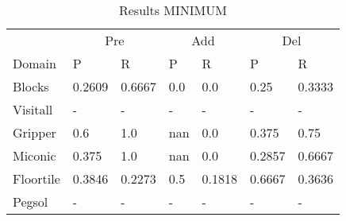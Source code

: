 \documentclass[]{article}
\begin{document}
\begin{table}
	\caption{Results MINIMUM}
	\label{tab:results_minimum}
	\begin{center}
		\begin{tabular}{l|l|l|l|l|l|l|}
			& \multicolumn{2}{|c|}{Pre} & \multicolumn{2}{|c|}{Add} & \multicolumn{2}{|c|}{Del}  \\ \cline{2-7}			 
			Domain & P & R & P & R & P & R \\
			\hline
			Blocks & 0.2609 & 0.6667 & 0.0 & 0.0 & 0.25 & 0.3333 \\
			Visitall & - & - & - & - & - & - \\
			Gripper & 0.6 & 1.0 & nan & 0.0 & 0.375 & 0.75 \\
			Miconic & 0.375 & 1.0 & nan & 0.0 & 0.2857 & 0.6667 \\
			Floortile & 0.3846 & 0.2273 & 0.5 & 0.1818 & 0.6667 & 0.3636 \\
			Pegsol & - & - & - & - & - & - \\
		\end{tabular}
	\end{center}	
\end{table}
\end{document}
